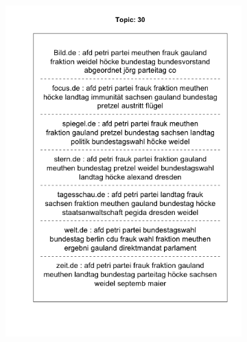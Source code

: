 \documentclass[12pt,a4paper,notitlepage]{article}
\begin{document}
\begin{figure}[H]
	\begin{center}
		\begin{subfigure}[normla]{0.49\textwidth}
			\includegraphics[width=\textwidth]{figs/plotquote30.png}
		\end{subfigure}
		\begin{subfigure}[normla]{0.49\textwidth}

\end{subfigure}
\end{center}
\end{figure}
\end{document}
